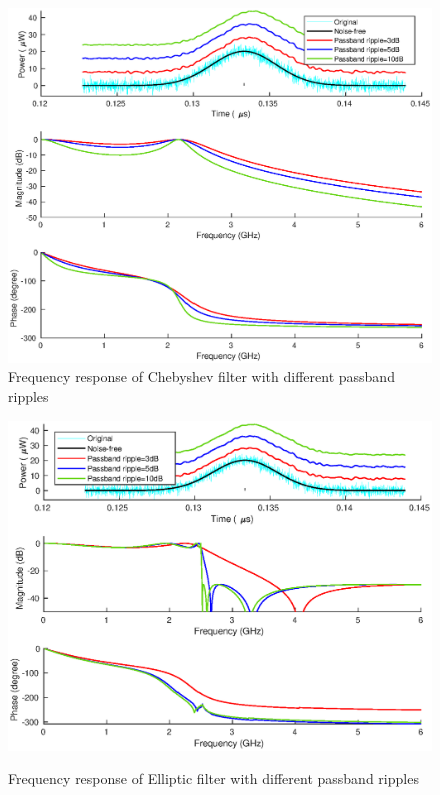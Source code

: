 \begin{figure}[t!p]
\centering
\includegraphics[width=1\textwidth]{figures/chapter_AFE/freq_response_cheby_diffPass.eps}
\caption{Frequency response of Chebyshev filter with different passband ripples}
\label{fig:AFE_freqResp_cheby_pass}
\end{figure}
%
\begin{figure}[t!p]
\centering
\includegraphics[width=1\textwidth]{figures/chapter_AFE/freq_response_elliptic_diffPass.eps}
\caption{Frequency response of Elliptic filter with different passband ripples}
\textbf{\label{fig:AFE_freqResp_ellip_pass}}
\end{figure}


